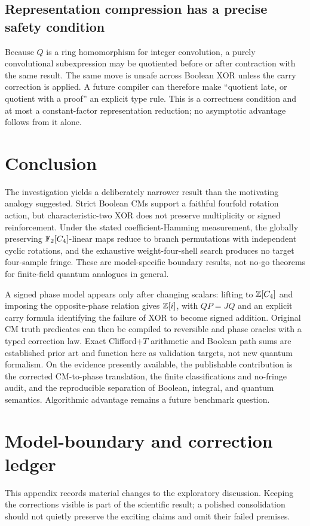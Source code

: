 \subsection{Representation compression has a precise safety condition}
Because $Q$ is a ring homomorphism for integer convolution, a purely convolutional subexpression may be quotiented before or after contraction with the same result.  The same move is unsafe across Boolean XOR unless the carry correction is applied.  A future compiler can therefore make ``quotient late, or quotient with a proof'' an explicit type rule.  This is a correctness condition and at most a constant-factor representation reduction; no asymptotic advantage follows from it alone.

\section{Conclusion}
The investigation yields a deliberately narrower result than the motivating analogy suggested.  Strict Boolean CMs support a faithful fourfold rotation action, but characteristic-two XOR does not preserve multiplicity or signed reinforcement.  Under the stated coefficient-Hamming measurement, the globally preserving $\mathbb F_2[C_4]$-linear maps reduce to branch permutations with independent cyclic rotations, and the exhaustive weight-four-shell search produces no target four-sample fringe.  These are model-specific boundary results, not no-go theorems for finite-field quantum analogues in general.

A signed phase model appears only after changing scalars: lifting to $\mathbb Z[C_4]$ and imposing the opposite-phase relation gives $\mathbb Z[i]$, with $QP=JQ$ and an explicit carry formula identifying the failure of XOR to become signed addition.  Original CM truth predicates can then be compiled to reversible and phase oracles with a typed correction law.  Exact Clifford+$T$ arithmetic and Boolean path sums are established prior art and function here as validation targets, not new quantum formalism.  On the evidence presently available, the publishable contribution is the corrected CM-to-phase translation, the finite classifications and no-fringe audit, and the reproducible separation of Boolean, integral, and quantum semantics.  Algorithmic advantage remains a future benchmark question.

\appendix
\section{Model-boundary and correction ledger}\label{app:audit}
This appendix records material changes to the exploratory discussion. Keeping the corrections visible is part of the scientific result; a polished consolidation should not quietly preserve the exciting claims and omit their failed premises.

